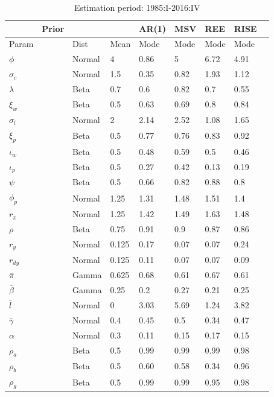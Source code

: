 \documentclass[12pt,reqno]{article}
\numberwithin{equation}{section}
\begin{document}
\begin{table}[H]
\caption{Estimation period: 1985:I-2016:IV}
\begin{tabular}{llll|ll|lll}
 & Prior &  &  & AR(1) & MSV & REE & RISE &  \\
 \hline
 \hline
Param &  & Dist & Mean & Mode & Mode & Mode & Mode &  \\
\hline
\hline
$\phi$ &  & Normal & 4 			& 0.86 & 5 & 6.72 & 4.91 &  \\
$\sigma_c$ &  & Normal & 1.5 	& 0.35 & 0.82 & 1.93 & 1.12 &  \\
$\lambda$ &  & Beta & 0.7 		& 0.6 & 0.82 & 0.7 & 0.55 &  \\
$\xi_w$ &  & Beta & 0.5 		& 0.63 & 0.69 & 0.8 & 0.84 &  \\
$\sigma_l$ &  & Normal & 2 		& 2.14 & 2.52 & 1.08 & 1.65 &  \\
$\xi_p$ &  & Beta & 0.5 		& 0.77 & 0.76 & 0.83 & 0.92 &  \\
$\iota_w$ &  & Beta & 0.5 		& 0.48 & 0.59 & 0.5 & 0.46 &  \\
$\iota_p$ &  & Beta & 0.5 		& 0.27 & 0.42 & 0.13 & 0.19 &  \\
$\psi$ &  & Beta & 0.5 			& 0.66 & 0.82 & 0.88 & 0.8 &  \\
$\phi_p$ &  & Normal & 1.25 	& 1.31 & 1.48 & 1.51 & 1.4 &  \\
$r_{\pi}$ &  & Normal & 1.25 	& 1.42 & 1.49 & 1.63 & 1.48 &  \\
$\rho$ &  & Beta & 0.75 		& 0.91 & 0.9 & 0.87 & 0.86 &  \\
$r_y$ &  & Normal & 0.125 		& 0.17 & 0.07 & 0.07 & 0.24 &  \\
$r_{dy}$ &  & Normal & 0.125 	& 0.11 & 0.07 & 0.07 & 0.09 &  \\
$\bar{\pi}$ &  & Gamma & 0.625 	& 0.68 & 0.61 & 0.67 & 0.61 &  \\
$\bar{\beta}$ &  & Gamma & 0.25 & 0.2 & 0.27 & 0.21 & 0.25 &  \\
$\bar{l}$ &  & Normal & 0 		& 3.03 & 5.69 & 1.24 & 3.82 &  \\
$\bar{\gamma}$ &  & Normal & 0.4& 0.45	 & 0.5 & 0.34 & 0.47 &  \\
$\alpha$ &  & Normal & 0.3 		& 0.11 & 0.15 & 0.17 & 0.15 &  \\
$\rho_a$ &  & Beta & 0.5 		& 0.99 & 0.99 & 0.99 & 0.98 &  \\
$\rho_b$ &  & Beta & 0.5 		& 0.60 & 0.58 & 0.34 & 0.96 &  \\
$\rho_g$ &  & Beta & 0.5 		& 0.99 & 0.99 & 0.95 & 0.98 &  \\

\end{tabular}
\end{table}
\end{document}
